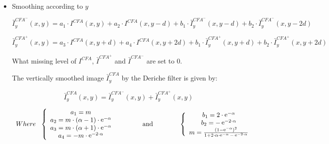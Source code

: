 \documentclass[twoside]{article}
\newcommand\Smo{\bar} %
\DeclareMathOperator{\e}{e}
\begin{document}
\begin{itemize}
	
	\item Smoothing according to $y$
	
		
	\begin{equation}
	\label{top-bottom}
	\Smo {I}^{{CFA}^-}_y(x,y)=a_1 \cdot I^{CFA}(x,y) + a_2 \cdot I^{CFA}(x,y-d) + b_1 \cdot \Smo {I}^{{CFA}^-}_y(x,y-d) + b_2 \cdot \Smo {I}^{{CFA}^-}_y(x,y-2d)
	\end{equation}
	
	
	
	\begin{equation}
	\label{bottom-top}
	\Smo {I}^{{CFA}^+}_y(x,y)=a_3 \cdot I^{CFA}(x,y+d) + a_4 \cdot I^{CFA}(x,y+2d) + b_1 \cdot \Smo {I}^{{CFA}^+}_y(x,y+d) + b_2 \cdot \Smo {I}^{{CFA}^+}_y(x,y+2d)
	\end{equation}
	
	
	What missing level of $I^{CFA}$, $\Smo {I}^{{CFA}^+}$ and $\Smo {I}^{{CFA}^-}$ are set to $0$.
 
	
	
	The vertically smoothed image $\Smo {I}^{CFA}_y$  by the Deriche filter is given by:	
	
	
	\begin{equation}
	\Smo {I}^{CFA}_y(x,y)=\Smo {I}^{{CFA}^-}_y(x,y) + \Smo {I}^{{CFA}^+}_y(x,y)
	\end{equation}
	
	
	
	
	\begin{equation}
	\begin{array}{lcl}
	Where~~\left\lbrace
	\begin{array}{cl}
	a_1 = m\\ 
	a_2 = m \cdot (\alpha -1)\cdot \e ^{-\alpha} \\
	a_3 = m \cdot (\alpha +1)\cdot \e ^{-\alpha}\\
	a_4 =-m \cdot \e ^{-2 \cdot \alpha}\\
	\end{array}\right.
	& \text{\hspace{1cm} and \hspace{1cm}} &
	\left\lbrace
	\begin{array}{cl}
	b_1 = 2\cdot \e ^{-\alpha}\\ 
	b_2 = -\e ^{-2 \cdot \alpha} \\
	m=\frac{(1-\e^{-\alpha})^2}{1+2 \cdot \alpha \cdot \e^{-\alpha}- \e ^{-2\cdot \alpha}}\\
	\end{array}\right.
	\end{array}
	\label{eq:parametre Deriche}
	\end{equation}
	
	
	
	
	
	
\end{itemize}
\end{document}
